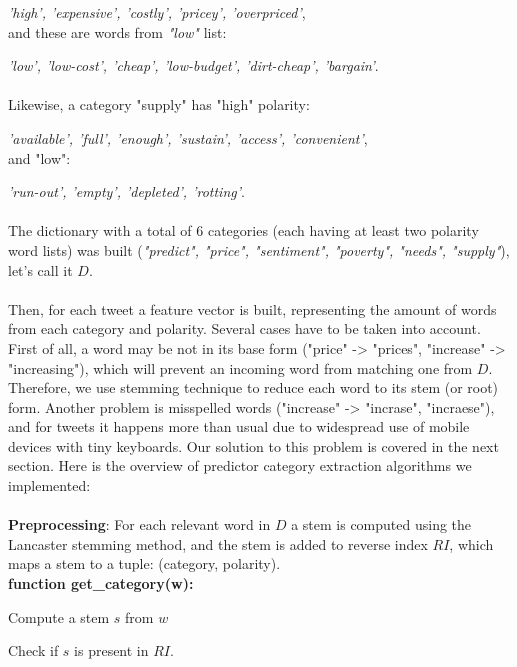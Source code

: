 \emph{'high', 'expensive', 'costly', 'pricey', 'overpriced'},
\\
and these are words from \emph{"low"} list:

\emph{'low', 'low-cost', 'cheap', 'low-budget', 'dirt-cheap', 'bargain'}.
\\ \\
Likewise, a category "supply" has "high" polarity:

\emph{'available', 'full', 'enough', 'sustain', 'access', 'convenient'},
\\
and "low":

\emph{'run-out', 'empty', 'depleted', 'rotting'}.
\\ \\
The dictionary with a total of 6 categories (each having at least two polarity word lists) was built (\emph{"predict", "price", "sentiment", "poverty", "needs", "supply"}), let's call it $D$.
\\ \\
Then, for each tweet a feature vector is built, representing the amount of words from each category and polarity. Several cases have to be taken into account. First of all, a word may be not in its base form ("price" -> "prices", "increase" -> "increasing"), which will prevent an incoming word from matching one from $D$. Therefore, we use stemming technique to reduce each word to its stem (or root) form. Another problem is misspelled words ("increase" -> "incrase", "incraese"), and for tweets it happens more than usual due to widespread use of mobile devices with tiny keyboards. Our solution to this problem is covered in the next section.
Here is the overview of predictor category extraction algorithms we implemented:\\ \\
\textbf{Preprocessing}: For each relevant word in $D$ a stem is computed using the Lancaster stemming method, and the stem is added to reverse index $RI$, which maps a stem to a tuple: (category, polarity). \\

\textbf{function get\_category(w):}

\indent
\begin{algorithm}[H]
Compute a stem $s$ from $w$ \par
Check if $s$ is present in $RI$.

\end{algorithm}
\noindent \\

